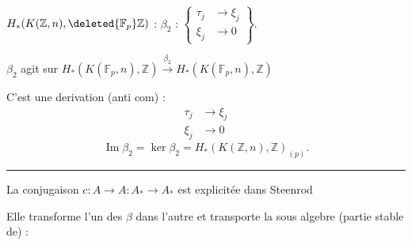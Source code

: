 $H_*(K(\mathbb Z,n),\deleted{\mathbb F_p}\mathbb Z)$ : $\beta_2$ :
$\left\{\begin{aligned}\tau_j&\longrightarrow\xi_j\\ \xi_j&\longrightarrow0\end{aligned}\right\}$.

$\beta_2$ agit sur $H_*(K(\mathbb F_p,n),\mathbb Z)\xrightarrow{\beta_2}H_*(K(\mathbb F_p,n),\mathbb Z)$

C'est une derivation (anti com) :
\[
\begin{aligned}\tau_j&\longrightarrow\xi_j\\ \xi_j&\longrightarrow0\end{aligned}
\]
\[
\operatorname{Im}\beta_2=\ker\beta_2=H_*(K(\mathbb Z,n),\mathbb Z)_{(p)} .
\]
\begin{center}\rule{1.2cm}{0.3pt}\end{center}
La conjugaison $c:A\longrightarrow A$\quad $:A_*\longrightarrow A_*$ est explicitée dans Steenrod

Elle transforme l'un des $\beta$ dans l'autre et transporte la sous algebre (partie stable de) :

